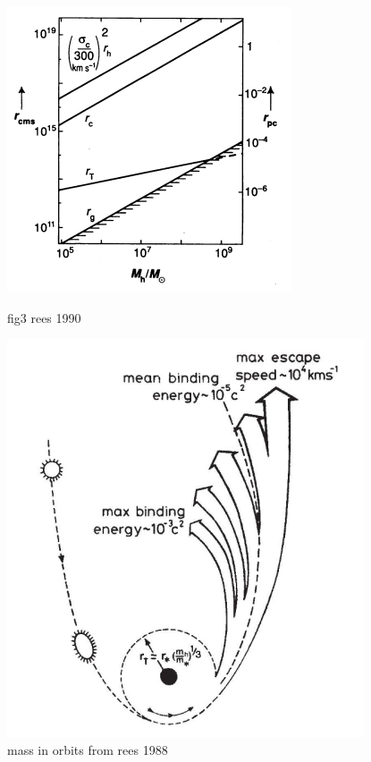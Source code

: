 \documentclass{tda}
\begin{document}
\begin{figure} [h]
	\centering
	\begin{minipage} {.5\textwidth}
		\centering
		\includegraphics[width=0.9\linewidth]{./images/rees1990.png}
		\caption{fig3 rees 1990}
	\end{minipage}%
	\begin{minipage} {.5\textwidth}
		\centering
		\includegraphics[width=0.9\linewidth]{./images/rees1988.png}
		\caption{mass in orbits from rees 1988}
	\end{minipage}
\end{figure}
\end{document}
